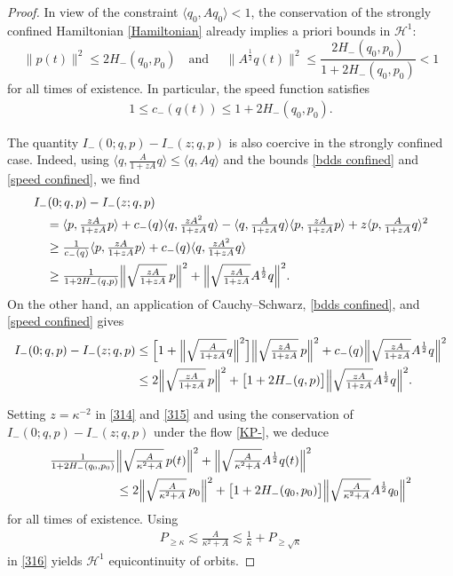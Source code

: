 \documentclass{amsart}
\newcommand{\qtq}[1]{\quad\text{#1}\quad}
\theoremstyle{definition}
\numberwithin{equation}{section}
\renewcommand{\H}{\mathcal H}
\newcommand{\la}{\langle}
\newcommand{\ra}{\rangle}
\begin{document}
\begin{proof}
In view of the constraint $\la q_0, Aq_0\ra<1$, the conservation of the strongly confined Hamiltonian \eqref{Hamiltonian} already implies a priori bounds in $\H^1$:
\begin{equation}\label{bdds confined}
\|p(t)\|^2\leq 2H_-(q_0,p_0) \qtq{and }\|A^{\frac12}q(t)\|^2 \leq \frac{2H_-(q_0,p_0)}{1+2H_-(q_0,p_0)} < 1
\end{equation}
for all times of existence. In particular, the speed function satisfies
\begin{align}\label{speed confined}
1\leq c_-(q(t)) \leq 1 + 2H_-(q_0,p_0).
\end{align}

The quantity $I_-(0;q,p)- I_-(z;q,p)$ is also coercive in the strongly confined case.  Indeed, using $\la q, \frac{A}{1+zA}q\ra \leq \la q,Aq\ra$ and the bounds \eqref{bdds confined} and \eqref{speed confined}, we find
\begin{align}\label{314}
&I_-(0;q,p)- I_-(z;q,p)\notag\\
&\quad= \langle p,\tfrac{zA}{1+zA}p\rangle+c_-(q)\langle q,\tfrac{zA^2}{1+zA}q\rangle -\langle q,\tfrac{A}{1+ zA}q\rangle\langle p,\tfrac{zA}{1+ zA}p\rangle+z\langle p,\tfrac{A}{1+ zA}q\rangle^2\notag\\
&\quad\geq \tfrac{1}{c_-(q)}\langle p,\tfrac{zA}{1+zA}p\rangle+c_-(q)\langle q,\tfrac{zA^2}{1+zA}q\rangle\notag\\
&\quad \geq \tfrac{1}{1 + 2H_-(q,p)}\Bigl\|\sqrt{\tfrac{zA}{1+zA}}\,p\Bigr\|^2+\Bigl\|\sqrt{\tfrac{zA}{1+zA}}A^{\frac12}q\Bigr\|^2.
\end{align}
On the other hand, an application of Cauchy--Schwarz,  \eqref{bdds confined}, and \eqref{speed confined} gives
\begin{align}\label{315}
I_-(0;q,p)- I_-(z;q,p)&\leq \Bigl[1+ \Bigl\|\sqrt{\tfrac{A}{1+zA}}q\Bigr\|^2 \Bigr]\Bigl\|\sqrt{\tfrac{zA}{1+zA}}\,p\Bigr\|^2 + c_-(q) \Bigl\|\sqrt{\tfrac{zA}{1+zA}}A^{\frac12}q\Bigr\|^2\notag\\
&\leq 2\Bigl\|\sqrt{\tfrac{zA}{1+zA}}\,p\Bigr\|^2 +  \bigl[1+ 2H_-(q,p)\bigr] \Bigl\|\sqrt{\tfrac{zA}{1+zA}}A^{\frac12}q\Bigr\|^2.
\end{align}

Setting $z=\kappa^{-2}$ in \eqref{314} and \eqref{315} and using the conservation of $I_-(0;q,p)- I_-(z;q,p)$ under the flow \eqref{KP-}, we deduce
\begin{align}\label{316}
\tfrac{1}{1 + 2H_-(q_0,p_0)}&\Bigl\|\sqrt{\tfrac{A}{\kappa^2+A}}\,p(t)\Bigr\|^2+\Bigl\|\sqrt{\tfrac{A}{\kappa^2+A}}A^{\frac12}q(t)\Bigr\|^2\notag\\
&\leq 2\Bigl\|\sqrt{\tfrac{A}{\kappa^2+A}}\,p_0\Bigr\|^2+\bigl[1+ 2H_-(q_0,p_0)\bigr]\Bigl\|\sqrt{\tfrac{A}{\kappa^2+A}}A^{\frac12}q_0\Bigr\|^2
\end{align}
for all times of existence.  Using
\begin{align}\label{318}
P_{\geq \kappa} \lesssim \tfrac{A}{\kappa^2 + A} \lesssim \tfrac1\kappa  + P_{\geq \sqrt \kappa}
\end{align}
in \eqref{316} yields $\H^1$ equicontinuity of orbits.



\end{proof}
\end{document}
